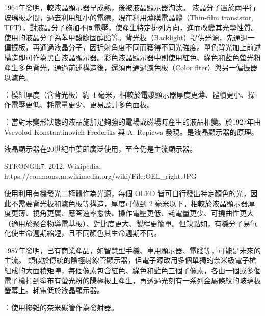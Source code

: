 \documentclass[a4paper,12pt]{report}
\begin{document}
\begin{itemize}
\begin{itemize}
1964年發明，較液晶顯示器早成熟，後被液晶顯示器淘汰。
\bct\bfH\ctr{}\ef\FB\ect
液晶分子置於兩平行玻璃板之間，過去利用細小的電線，現在利用薄膜電晶體（Thin-film transistor, TFT），對液晶分子施加不同電壓，使產生特定排列方向，進而改變其光學性質。使用的液晶分子為苯甲酸膽固醇酯等。背光板（Backlight）提供光源，先通過一偏振板，再通過液晶分子，因折射角度不同而獲得不同光強度。單色背光加上前述構造即可作為黑白液晶顯示器。彩色液晶顯示器中則使用紅色、綠色和藍色螢光粉產生多色背光，通過前述構造後，還須再通過濾色板（Color flter）與另一偏振器以濾色。

：模組厚度（含背光板）約 4 毫米，相較於電漿顯示器厚度更薄、體積更小、操作電壓更低、耗電量更少、更易設計多色面板。

：當對未變形狀態的液晶施加足夠強的電場或磁場時產生的液晶相變。於1927年由 Vsevolod Konstantinovich Frederiks 與 A. Repiewa 發現。是液晶顯示器的原理。

液晶顯示器在20世紀中葉即廣泛使用，至今仍是主流顯示器。
\bct\bfH\ctr{}\caption{STRONGlk7. 2012. Wikipedia. https://commons.m.wikimedia.org/wiki/File:OEL\_right.JPG}\ef\FB\ect
使用利用有機發光二極體作為光源，每個 OLED 皆可自行發出特定顏色的光，因此不需要背光板和濾色板等構造，厚度可做到 2 毫米以下。相較於液晶顯示器厚度更薄、視角更廣、應答速率愈快、操作電壓更低、耗電量更少、可撓曲性更大（適用於聚合物導電基板）、對比度更大、製程更簡單。但缺點如，有機分子易氧化使生命週期縮短，且不同顏色其生命週期不同。

1987年發明，已有商業產品，如智慧型手機、車用顯示器、電腦等，可能是未來的主流。
類似於傳統的陰極射線管顯示器，但電子源改用多個單獨的奈米級電子槍組成的大面積矩陣，每個像素包含紅色、綠色和藍色三個子像素，各由一個或多個電子槍打到塗布有螢光粉的陽極板上產生，再透過光刻有一系列金屬條紋的玻璃板螢幕上。耗電低於液晶顯示器。

：使用摻雜的奈米碳管作為發射器。


\end{itemize}
\end{itemize}
\end{document}
